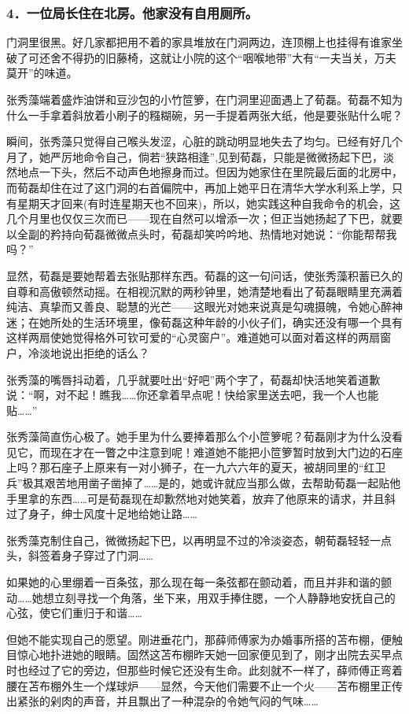 \subsubsection*{4．一位局长住在北房。他家没有自用厕所。}
\par 门洞里很黑。好几家都把用不着的家具堆放在门洞两边，连顶棚上也挂得有谁家坐破了可还舍不得扔的旧藤椅，这就让小院的这个“咽喉地带”大有“一夫当关，万夫莫开”的味道。
\par 张秀藻端着盛炸油饼和豆沙包的小竹笸箩，在门洞里迎面遇上了荀磊。荀磊不知为什么一手拿着斜放着小刷子的糨糊碗，另一手提着两张大纸，他是要张贴什么呢？
\par 瞬间，张秀藻只觉得自己喉头发涩，心脏的跳动明显地失去了均匀。已经有好几个月了，她严厉地命令自己，倘若“狭路相逢”,见到荀磊，只能是微微扬起下巴，淡然地点一下头，然后不动声色地擦身而过。但因为她家住在里院最后面的北房中，而荀磊却住在过了这门洞的右首偏院中，再加上她平日在清华大学水利系上学，只有星期天才回来(有时连星期天也不回来)，所以，她实践这种自我命令的机会，这几个月里也仅仅三次而已——现在自然可以增添一次；但正当她扬起了下巴，就要以全副的矜持向荀磊微微点头时，荀磊却笑吟吟地、热情地对她说：“你能帮帮我吗？”
\par 显然，荀磊是要她帮着去张贴那样东西。荀磊的这一句问话，使张秀藻积蓄已久的自尊和高傲顿然动摇。在相视沉默的两秒钟里，她清楚地看出了荀磊眼睛里充满着纯洁、真挚而又善良、聪慧的光芒——这眼光对她来说真是勾魂摄魄，令她心醉神迷；在她所处的生活环境里，像荀磊这种年龄的小伙子们，确实还没有哪一个具有这样两扇使她觉得格外可钦可爱的“心灵窗户”。难道她可以面对着这样的两扇窗户，冷淡地说出拒绝的话么？
\par 张秀藻的嘴唇抖动着，几乎就要吐出“好吧”两个字了，荀磊却快活地笑着道歉说：“啊，对不起！瞧我……你还拿着早点呢！快给家里送去吧，我一个人也能贴……”
\par 张秀藻简直伤心极了。她手里为什么要捧着那么个小笸箩呢？荀磊刚才为什么没看见它，而现在才在一瞥之中注意到呢！难道她不能把小笸箩暂时放到大门边的石座上吗？那石座子上原来有一对小狮子，在一九六六年的夏天，被胡同里的“红卫兵”极其艰苦地用凿子凿掉了……是的，她或许就应当那么做，去帮助荀磊一起贴他手里拿的东西……可是荀磊现在却歉然地对她笑着，放弃了他原来的请求，并且斜过了身子，绅士风度十足地给她让路……
\par 张秀藻克制住自己，微微扬起下巴，以再明显不过的冷淡姿态，朝荀磊轻轻一点头，斜签着身子穿过了门洞……
\par 如果她的心里绷着一百条弦，那么现在每一条弦都在颤动着，而且并非和谐的颤动……她想立刻寻找一个角落，坐下来，用双手捧住腮，一个人静静地安抚自己的心弦，使它们重归于和谐……
\par 但她不能实现自己的愿望。刚进垂花门，那薛师傅家为办婚事所搭的苫布棚，便触目惊心地扑进她的眼睛。固然这苫布棚昨天她一回家便见到了，刚才出院去买早点时也经过了它的旁边，但那些时候它还没有生命。此刻就不一样了，薛师傅正弯着腰在苫布棚外生一个煤球炉——显然，今天他们需要不止一个火——苫布棚里正传出紧张的剁肉的声音，并且飘出了一种混杂的令她气闷的气味……
